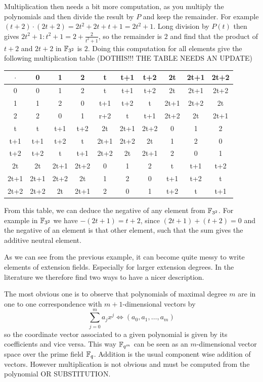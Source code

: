 \begin{example}
Multiplication then needs a bit more computation, as you multiply the polynomials and then divide the result by $P$ and keep the remainder. For example 
$(t+2) \cdot (2t+2)= 2t^2 + 2t + t + 1 = 2t^2+1$. Long division by $P(t)$ then gives $2t^2+1:t^2+1= 2 + \frac{2}{t^2+1}$, so the remainder is $2$ and find that the product of $t+2$ and $2t+2$ in $\mathbb{F}_{3^2}$ is $2$. Doing this computation for all elements give the following multiplication table (DOTHIS!!! THE TABLE NEEDS AN UPDATE)
\begin{center}
  \begin{tabular}{c | c c c c c c c c c}
$\cdot$ & 0    & 1    & 2    & t    & t+1  & t+2  & 2t   & 2t+1 & 2t+2 \\\hline
      0 & 0    & 1    & 2    & t    & t+1  & t+2  & 2t   & 2t+1 & 2t+2 \\
      1 & 1    & 2    & 0    & t+1  & t+2  & t    & 2t+1 & 2t+2 & 2t   \\
      2 & 2    & 0    & 1    & r+2  & t    & t+1  & 2t+2 & 2t   & 2t+1 \\
      t & t    & t+1  & t+2  & 2t   & 2t+1 & 2t+2 & 0    & 1    & 2    \\
    t+1 & t+1  & t+2  & t    & 2t+1 & 2t+2 & 2t   & 1    & 2    & 0    \\
    t+2 & t+2  & t    & t+1  & 2t+2 & 2t   & 2t+1 & 2    & 0    & 1    \\
     2t & 2t   & 2t+1 & 2t+2 & 0    & 1    & 2    & t    & t+1  & t+2  \\
   2t+1 & 2t+1 & 2t+2 & 2t   & 1    & 2    & 0    & t+1  & t+2  & t    \\
   2t+2 & 2t+2 & 2t   & 2t+1 & 2    & 0    & 1    & t+2  & t    & t+1
  \end{tabular}
\end{center}
From this table, we can deduce the negative of any element from $\mathbb{F}_{3^2}$. For example in $\mathbb{F}_{3^2}$ we have $-(2t+1)= t+2$, since $(2t+1) + (t+2)=0$ and the negative of an element is that other element, such that the sum gives the additive neutral element.
\end{example}
As we can see from the previous example, it can become quite messy to write elements of extension fields. Especially for larger extension degrees. In the literature we therefore find two ways to have a nicer description.

The most obvious one is to observe that polynomials of maximal degree $m$ are in one to one correspondence with $m+1$-dimensional vectors by
$$
\sum_{j=0}^m a_j x^j \Leftrightarrow \left(a_0,a_1,\ldots,a_m\right)
$$
so the coordinate vector associated to a given polynomial is given by its coefficients and vice versa. This way $\mathbb{F}_{q^m}$ can be seen as an $m$-dimensional vector space over the prime field $\mathbb{F}_q$. Addition is the usual component wise addition of vectors. However multiplication is not obvious and must be computed from the polynomial OR SUBSTITUTION.

